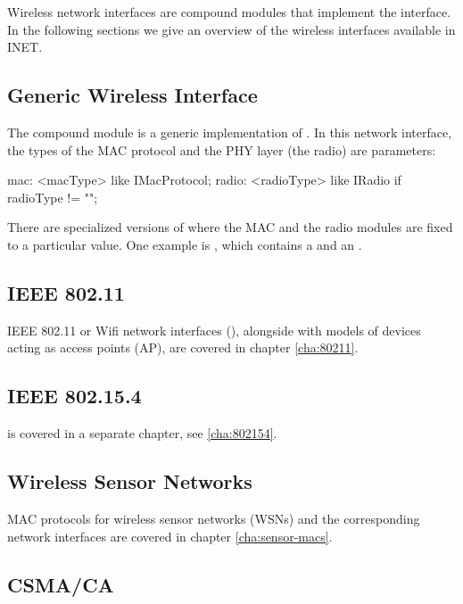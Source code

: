 Wireless network interfaces are compound modules that implement the 
 interface. In the following sections we 
give an overview of the wireless interfaces available in INET.

\subsection{Generic Wireless Interface}

The  compound module is a generic implementation
of . In this network interface, the types of the
MAC protocol and the PHY layer (the radio) are parameters:

\begin{ned}
mac: <macType> like IMacProtocol;
radio: <radioType> like IRadio if radioType != "";
\end{ned}

There are specialized versions of  where 
the MAC and the radio modules are fixed to a particular value. 
One example is , which contains a 
and an .

\subsection{IEEE 802.11}

IEEE 802.11 or Wifi network interfaces (),
alongside with models of devices acting as access points (AP),
are covered in chapter \ref{cha:80211}.

\subsection{IEEE 802.15.4}

 is covered in a separate chapter, see \ref{cha:802154}.

\subsection{Wireless Sensor Networks}

MAC protocols for wireless sensor networks (WSNs) and the corresponding
network interfaces are covered in chapter \ref{cha:sensor-macs}.

\subsection{CSMA/CA} 

